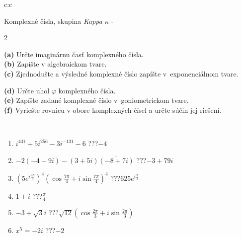 \documentclass[10pt]{report}
\begin{document}
\begin{tabular}{c:c}
\begin{minipage}[c][104.5mm][t]{0.5\linewidth}
\begin{center}
\vspace{7mm}
{\huge Komplexné čísla, skupina \textit{Kappa $\kappa$} -}\\[5mm]
\begin{minipage}{0.95\linewidth}
\begin{center}
{\small \begin{multicols}{2} \raggedright
\textbf{(a)} Určte imaginárnu časť komplexného čísla. \\[1mm]
\textbf{(b)} Zapíšte v algebraickom tvare. \\[1mm]
\textbf{(c)} Zjednodušte a výsledné komplexné číslo zapíšte v~exponenciálnom tvare. \par \columnbreak
\textbf{(d)} Určte uhol \(\varphi\) komplexného čísla. \\[1mm]
\textbf{(e)} Zapíšte zadané komplexné číslo v~goniometrickom tvare. \\[1mm]
\textbf{(f)} Vyriešte rovnicu v obore komplexných čísel a určte súčin jej riešení.
\end{multicols}
}
\end{center}
\end{minipage}
\\[4mm]
\begin{minipage}{0.79\linewidth}
\begin{center}
\begin{varwidth}{\linewidth}
\begin{enumerate}
\large
\item $i^{431}+5i^{256}-3i^{-131}-6$\quad \dotfill\; ???\;\dotfill \quad $-4$
\item $-2(-4-9i)-(3+5i)\overline{(-8+7i)}$\quad \dotfill\; ???\;\dotfill \quad $-3+79i$
\item $\left(5e^{i\frac{4\pi}{3}}\right)^{4}\left(\cos{\frac{7\pi}{4}}+i\sin{\frac{7\pi}{4}}\right)^{4}$\quad \dotfill\; ???\;\dotfill \quad $625e^{i\frac{\pi}{3}}$
\item $1+i$\quad \dotfill\; ???\;\dotfill \quad $\frac{\pi}{4}$
\item $-3+\sqrt{3}i$\quad \dotfill\; ???\;\dotfill \quad $\sqrt{12}\left(\cos{\frac{2\pi}{3}}+i\sin{\frac{2\pi}{3}}\right)$
\item $x^5=-2i$\quad \dotfill\; ???\;\dotfill \quad $-2$
\end{enumerate}
\end{varwidth}

\end{center}
\end{minipage}
\end{center}
\end{minipage}
\end{tabular}
\end{document}
